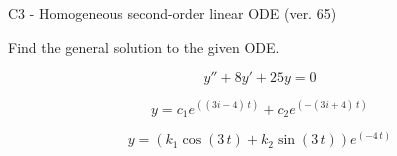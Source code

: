 \begin{exercise}
  \begin{exerciseTitle}C3 - Homogeneous second-order linear ODE (ver. 65)\end{exerciseTitle}
  \begin{exerciseStatement}
    
Find the general solution to the given ODE.

    
\[y''+8y'+25y = 0\]

  \end{exerciseStatement}
  \begin{exerciseAnswer}
    
\[y= c_{1} e^{\left(\left(3 i - 4\right) \, t\right)} + c_{2} e^{\left(-\left(3 i + 4\right) \, t\right)}\]

    
\[y= {\left(k_{1} \cos\left(3 \, t\right) + k_{2} \sin\left(3 \, t\right)\right)} e^{\left(-4 \, t\right)}\]

  \end{exerciseAnswer}
\end{exercise}